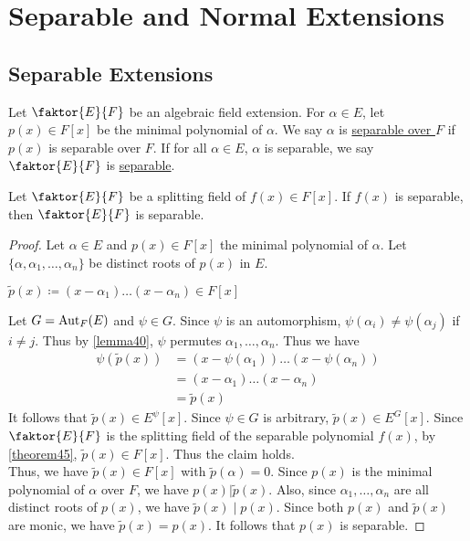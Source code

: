 \documentclass[11pt]{article}
\newcommand{\quotient}[2]{\faktor{#1}{#2}}
\begin{document}
\pagebreak
\section{Separable and Normal Extensions}
\subsection{Separable Extensions}
\begin{definition}
Let $\quotient{E}{F}$ be an algebraic field extension. For $\alpha \in E$, let
$p(x) \in F[x]$ be the minimal polynomial of $\alpha$. We say $\alpha$ is
\underline{separable over $F$} if $p(x)$ is separable over $F$. If for all
$\alpha \in E$, $\alpha$ is separable, we say $\quotient{E}{F}$ is
\underline{separable}.
\end{definition}
\begin{theorem}
Let $\quotient{E}{F}$ be a splitting field of $f(x)\in F[x]$. If $f(x)$ is
separable, then $\quotient{E}{F}$ is separable.
\label{theorem46}
\end{theorem}
\begin{proof}
Let $\alpha\in E$ and $p(x)\in F[x]$ the minimal polynomial of $\alpha$. Let
$\{\alpha,\alpha_1,\dots,\alpha_n\}$ be distinct roots of $p(x)$ in $E$.

\begin{claim}
$\tilde p(x)\coloneqq(x-\alpha_1)\dots(x-\alpha_n)\in F[x]$
\end{claim}
Let $G=\operatorname{Aut}_F(E)$ and $\psi\in G$. Since $\psi$ is an automorphism,
$\psi(\alpha_i)\neq\psi(\alpha_j)$ if $i\neq j$. Thus by \cref{lemma40}, $\psi$
permutes $\alpha_1,\dots,\alpha_n$. Thus we have
\begin{align*}
\psi(\tilde p(x)) &=(x-\psi(\alpha_1))\dots(x-\psi(\alpha_n))\\
&=(x-\alpha_1)\dots(x-\alpha_n)\\
&=\tilde p(x)
\end{align*}
It follows that $\tilde p(x)\in E^\psi[x]$. Since $\psi\in G$ is arbitrary,
$\tilde p(x)\in E^G[x]$. Since $\quotient{E}{F}$ is the splitting field of the
separable polynomial $f(x)$, by \cref{theorem45}, $\tilde p(x)\in F[x]$. Thus
the claim holds.\\

Thus, we have $\tilde p(x)\in F[x]$ with $\tilde p(\alpha)=0$. Since $p(x)$ is
the minimal polynomial of $\alpha$ over $F$, we have $p(x)|\tilde p(x)$. Also,
since $\alpha_1,\dots,\alpha_n$ are all distinct roots of $p(x)$, we have
$\tilde p(x) \mid p(x)$. Since both $p(x)$ and $\tilde p(x)$ are monic, we have
$\tilde p(x)=p(x)$. It follows that $p(x)$ is separable.
\end{proof}
\end{document}

